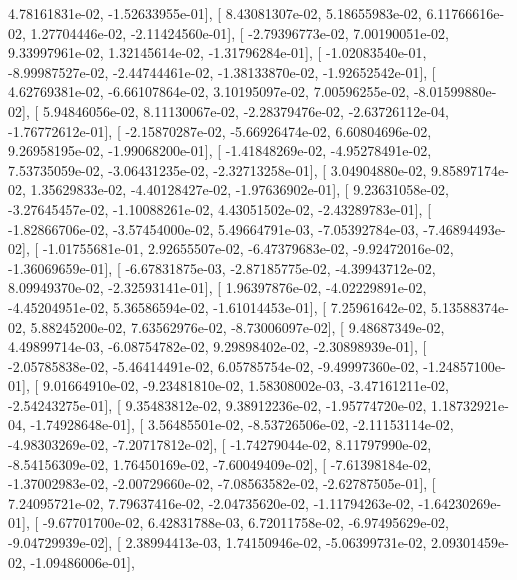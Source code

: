 \documentclass{article}
\begin{document}
          4.78161831e-02,  -1.52633955e-01],
       [  8.43081307e-02,   5.18655983e-02,   6.11766616e-02,
          1.27704446e-02,  -2.11424560e-01],
       [ -2.79396773e-02,   7.00190051e-02,   9.33997961e-02,
          1.32145614e-02,  -1.31796284e-01],
       [ -1.02083540e-01,  -8.99987527e-02,  -2.44744461e-02,
         -1.38133870e-02,  -1.92652542e-01],
       [  4.62769381e-02,  -6.66107864e-02,   3.10195097e-02,
          7.00596255e-02,  -8.01599880e-02],
       [  5.94846056e-02,   8.11130067e-02,  -2.28379476e-02,
         -2.63726112e-04,  -1.76772612e-01],
       [ -2.15870287e-02,  -5.66926474e-02,   6.60804696e-02,
          9.26958195e-02,  -1.99068200e-01],
       [ -1.41848269e-02,  -4.95278491e-02,   7.53735059e-02,
         -3.06431235e-02,  -2.32713258e-01],
       [  3.04904880e-02,   9.85897174e-02,   1.35629833e-02,
         -4.40128427e-02,  -1.97636902e-01],
       [  9.23631058e-02,  -3.27645457e-02,  -1.10088261e-02,
          4.43051502e-02,  -2.43289783e-01],
       [ -1.82866706e-02,  -3.57454000e-02,   5.49664791e-03,
         -7.05392784e-03,  -7.46894493e-02],
       [ -1.01755681e-01,   2.92655507e-02,  -6.47379683e-02,
         -9.92472016e-02,  -1.36069659e-01],
       [ -6.67831875e-03,  -2.87185775e-02,  -4.39943712e-02,
          8.09949370e-02,  -2.32593141e-01],
       [  1.96397876e-02,  -4.02229891e-02,  -4.45204951e-02,
          5.36586594e-02,  -1.61014453e-01],
       [  7.25961642e-02,   5.13588374e-02,   5.88245200e-02,
          7.63562976e-02,  -8.73006097e-02],
       [  9.48687349e-02,   4.49899714e-03,  -6.08754782e-02,
          9.29898402e-02,  -2.30898939e-01],
       [ -2.05785838e-02,  -5.46414491e-02,   6.05785754e-02,
         -9.49997360e-02,  -1.24857100e-01],
       [  9.01664910e-02,  -9.23481810e-02,   1.58308002e-03,
         -3.47161211e-02,  -2.54243275e-01],
       [  9.35483812e-02,   9.38912236e-02,  -1.95774720e-02,
          1.18732921e-04,  -1.74928648e-01],
       [  3.56485501e-02,  -8.53726506e-02,  -2.11153114e-02,
         -4.98303269e-02,  -7.20717812e-02],
       [ -1.74279044e-02,   8.11797990e-02,  -8.54156309e-02,
          1.76450169e-02,  -7.60049409e-02],
       [ -7.61398184e-02,  -1.37002983e-02,  -2.00729660e-02,
         -7.08563582e-02,  -2.62787505e-01],
       [  7.24095721e-02,   7.79637416e-02,  -2.04735620e-02,
         -1.11794263e-02,  -1.64230269e-01],
       [ -9.67701700e-02,   6.42831788e-03,   6.72011758e-02,
         -6.97495629e-02,  -9.04729939e-02],
       [  2.38994413e-03,   1.74150946e-02,  -5.06399731e-02,
          2.09301459e-02,  -1.09486006e-01],
\end{document}
